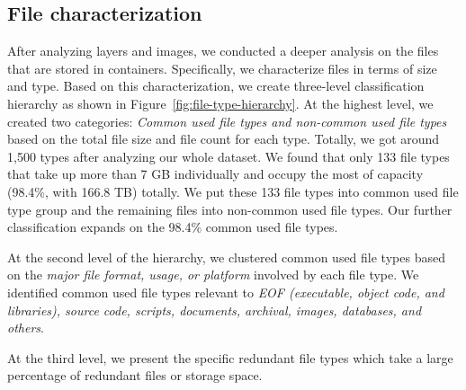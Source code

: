 \subsection{File characterization}

After analyzing layers and images, we conducted a deeper analysis on the files that are stored in containers.%
Specifically, we characterize files in terms of size and type.   
Based on this characterization, we create three-level classification hierarchy as shown in Figure~\ref{fig:file-type-hierarchy}.
At the highest level, we created two categories: \textit{Common used file types and non-common used file types} based on the total file size and file count for each type. 
Totally, we got around 1,500 types after analyzing our whole dataset. 
We found that only 133 file types that take up more than 7 GB individually and occupy the most of capacity (98.4\%, with 166.8 TB) totally.
We put these 133 file types into common used file type group and the remaining files into non-common used file types. Our further classification expands on the 98.4\% common used file types. 
%

At the second level of the hierarchy, we clustered common used file types based on the \textit{major file format, usage, or platform} involved by each file type. We identified common used file types relevant to \textit{EOF (executable, object code, and libraries), source code, scripts, documents, archival, images, databases, and others}.

At the third level, we present the specific redundant file types which take a large percentage of redundant files or storage space.

